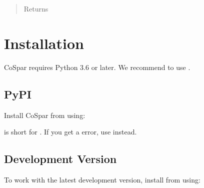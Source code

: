 \documentclass[letterpaper,10pt,english]{sphinxmanual}
\begin{document}
\begin{fulllineitems}
\begin{quote}
\begin{description}
\begin{description}
\end{description}

\item[{Returns}] \leavevmode
{}

\end{description}\end{quote}

\end{fulllineitems}



\section{Installation}
\label{\detokenize{installation:installation}}\label{\detokenize{installation::doc}}
CoSpar requires Python 3.6 or later. We recommend to use .


\subsection{PyPI}
\label{\detokenize{installation:pypi}}
Install CoSpar from  using:

\begin{sphinxVerbatim}[commandchars=\\\{\}]
   
\end{sphinxVerbatim}

 is short for .
If you get a  error, use  instead.


\subsection{Development Version}
\label{\detokenize{installation:development-version}}
To work with the latest development version, install from  using:

\begin{sphinxVerbatim}[commandchars=\\\{\}]
  
\end{sphinxVerbatim}
\end{document}
